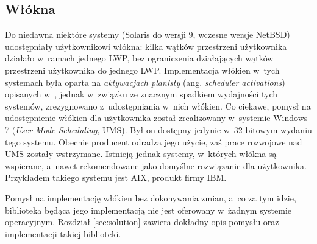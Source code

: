 \documentclass[12pt]{mwart}
\begin{document}
\subsection{Włókna}
\label{sec:fibers}
%
\indent
  Do niedawna niektóre systemy (Solaris do wersji 9, wczesne wersje NetBSD) udostępniały użytkownikowi włókna: kilka wątków przestrzeni użytkownika
  działało w~ramach jednego LWP, bez ograniczenia działających wątków przestrzeni użytkownika do jednego LWP.
  Implementacja włókien w~tych systemach była oparta na \emph{aktywacjach planisty} (ang. \emph{scheduler activations}) opisanych
  w~\cite{hennessy}, jednak
  w~związku ze znacznym spadkiem wydajności tych systemów, zrezygnowano z~udostępniania w~nich włókien.
  Co ciekawe, pomysł na udostępnienie włókien dla użytkownika został zrealizowany w~systemie Windows 7 (\emph{User Mode Scheduling}, UMS). Był on dostępny
  jedynie w~32-bitowym wydaniu tego systemu. Obecnie producent odradza jego użycie, zaś prace rozwojowe nad UMS zostały wstrzymane.
  Istnieją jednak systemy, w~których włókna są wspierane, a~nawet rekomendowane jako domyślne rozwiązanie dla użytkownika. Przykładem takiego systemu jest
  AIX, produkt firmy IBM.
\par
%
\indent
  Pomysł na implementację włókien bez dokonywania zmian, a~co za tym idzie, biblioteka będąca jego implementacją nie jest oferowany w~żadnym systemie operacyjnym.
  Rozdział \ref{sec:solution} zawiera dokładny opis pomysłu oraz implementacji takiej biblioteki.
\par
%
\end{document}
